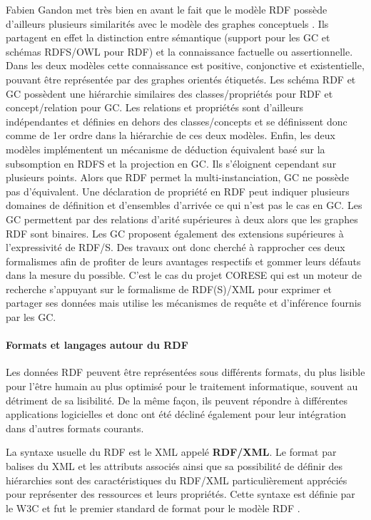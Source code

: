 Fabien Gandon met très bien en avant le fait que le modèle RDF possède d'ailleurs plusieurs similarités avec le modèle des graphes conceptuels \cite{gandon_graphes_2008}. Ils partagent en effet la distinction entre sémantique (support pour les GC et schémas RDFS/OWL pour RDF) et la connaissance factuelle ou assertionnelle. Dans les deux modèles cette connaissance est positive, conjonctive et existentielle, pouvant être représentée par des graphes orientés étiquetés. Les schéma RDF et GC possèdent une hiérarchie similaires des classes/propriétés pour RDF et concept/relation pour GC. Les relations et propriétés sont d'ailleurs indépendantes et définies en dehors des classes/concepts et se définissent donc comme de 1er ordre dans la hiérarchie de ces deux modèles. Enfin, les deux modèles implémentent un mécanisme de déduction équivalent basé sur la subsomption en RDFS et la projection en GC. Ils s'éloignent cependant sur plusieurs points. Alors que RDF permet la multi-instanciation, GC ne possède pas d'équivalent. Une déclaration de propriété en RDF peut indiquer plusieurs domaines de définition et d'ensembles d'arrivée ce qui n'est pas le cas en GC. Les GC permettent par des relations d'arité supérieures à deux alors que les graphes RDF sont binaires. Les GC proposent également des extensions supérieures à l'expressivité de RDF/S.
Des travaux ont donc cherché à rapprocher ces deux formalismes afin de profiter de leurs avantages respectifs et gommer leurs défauts dans la mesure du possible. C'est le cas du projet CORESE \cite{corby2006searching} qui est un moteur de recherche s'appuyant sur le formalisme de RDF(S)/XML pour exprimer et partager ses données mais utilise les mécanismes de requête et d'inférence fournis par les GC. 

\paragraph{Formats et langages autour du RDF}

Les données RDF peuvent être représentées sous différents formats, du plus lisible pour l'être humain au plus optimisé pour le traitement informatique, souvent au détriment de sa lisibilité. De la même façon, ils peuvent répondre à différentes applications logicielles et donc ont été décliné également pour leur intégration dans d'autres formats courants.

La syntaxe usuelle du RDF est le XML appelé \textbf{RDF/XML}. Le format par balises du XML et les attributs associés ainsi que sa possibilité de définir des hiérarchies sont des caractéristiques du RDF/XML particulièrement appréciés pour représenter des ressources et leurs propriétés. Cette syntaxe est définie par le W3C et fut le premier standard de format pour le modèle RDF \cite{beckett2004rdf}.

